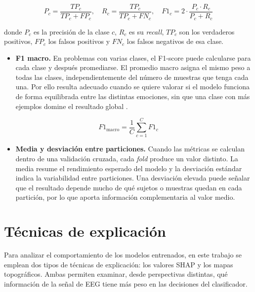 \begin{myequation}[H]
\[
P_c = \frac{TP_c}{TP_c + FP_c}, \quad
R_c = \frac{TP_c}{TP_c + FN_c}, \quad
F1_c = 2 \cdot \frac{P_c \cdot R_c}{P_c + R_c}
\]
\caption{Precisión, recall y F1-score para una clase \(c\).}
\label{eq:precision_recall_f1}
\end{myequation}

donde \(P_c\) es la precisión de la clase \(c\), \(R_c\) es su \textit{recall}, \(TP_c\) son los verdaderos positivos, \(FP_c\) los falsos positivos y \(FN_c\) los falsos negativos de esa clase.

\begin{itemize}
    \item \textbf{F1 macro.} En problemas con varias clases, el F1-score puede calcularse para cada clase y después promediarse. El promedio macro asigna el mismo peso a todas las clases, independientemente del número de muestras que tenga cada una. Por ello resulta adecuado cuando se quiere valorar si el modelo funciona de forma equilibrada entre las distintas emociones, sin que una clase con más ejemplos domine el resultado global \cite{sklearnMetrics}.
\end{itemize}

\begin{myequation}[H]
\[
F1_{\mathrm{macro}} = \frac{1}{C}\sum_{c=1}^{C} F1_c
\]
\caption{F1 macro como promedio no ponderado del F1-score por clase.}
\label{eq:f1_macro}
\end{myequation}

\begin{itemize}
    \item \textbf{Media y desviación entre particiones.} Cuando las métricas se calculan dentro de una validación cruzada, cada \textit{fold} produce un valor distinto. La media resume el rendimiento esperado del modelo y la desviación estándar indica la variabilidad entre particiones. Una desviación elevada puede señalar que el resultado depende mucho de qué sujetos o muestras quedan en cada partición, por lo que aporta información complementaria al valor medio.
\end{itemize}



\section{Técnicas de explicación}


Para analizar el comportamiento de los modelos entrenados, en este trabajo se emplean dos tipos de técnicas de explicación: los valores \ac{SHAP} y los mapas topográficos. Ambas permiten examinar, desde perspectivas distintas, qué información de la señal de \ac{EEG} tiene más peso en las decisiones del clasificador.

